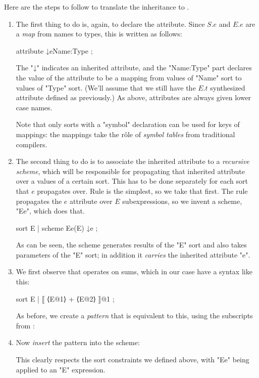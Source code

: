 \documentclass[11pt]{article} %
\begin{document}
Here are the steps to follow to translate the inheritance to \HAX.
\begin{enumerate}

\item The first thing to do is, again, to declare the attribute.  Since $S.e$ and $E.e$ are a
  \emph{map} from names to types, this is written as follows:
\begin{hacs}
   attribute ↓e{Name:Type} ;
\end{hacs}
  The "↓" indicates an inherited attribute, and the "{Name:Type}" part declares the value of the
  attribute to be a mapping from values of "Name" sort to values of "Type" sort. (We'll assume that
  we still have the $E.t$ synthesized attribute defined as previously.)  As above, attributes are
  always given lower case names.

  Note that only sorts with a "symbol" declaration can be used for keys of mappings: the mappings
  take the rôle of \emph{symbol tables} from traditional compilers.

\item The second thing to do is to associate the inherited attribute to a \emph{recursive scheme},
  which will be responsible for propagating that inherited attribute over a values of a certain
  sort.  This has to be done separately for each sort that $e$ propagates over.  Rule  is
  the simplest, so we take that first.  The rule propagates the $e$ attribute over $E$
  subexpressions, so we invent a scheme, "Ee", which does that.
\begin{hacs}
   sort E | scheme Ee(E) ↓e ;
\end{hacs}
  As can be seen, the scheme generates results of the "E" sort and also takes parameters of the "E"
  sort; in addition it \emph{carries} the inherited attribute "e".

\item We first observe that  operates on sums, which in our case have a syntax like this:
\begin{hacs}
   sort E | ⟦ ⟨E@1⟩ + ⟨E@2⟩ ⟧@1 ;
\end{hacs}
  As before, we create a \emph{pattern} that is equivalent to this, using the subscripts from :

\item Now \emph{insert} the pattern into the scheme:
  This clearly respects the sort constraints we defined above, with "Ee" being applied to an "E" expression.


\end{enumerate}
\end{document}
